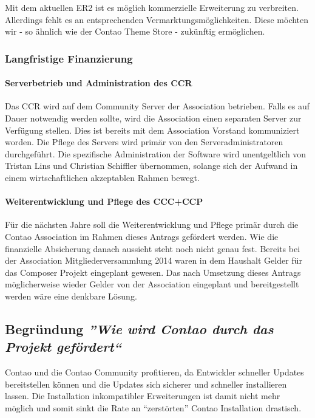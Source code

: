 \documentclass[
paper=a4,
draft=false,%
fontsize=10pt%
]{scrartcl}
\begin{document}
Mit dem aktuellen ER2 ist es möglich kommerzielle Erweiterung zu verbreiten. Allerdings fehlt es an entsprechenden Vermarktungsmöglichkeiten. Diese möchten wir - so ähnlich wie der Contao Theme Store - zukünftig ermöglichen.

\subsubsection{Langfristige Finanzierung}

\paragraph{Serverbetrieb und Administration des CCR}
Das CCR wird auf dem Community Server der Association betrieben. Falls es auf Dauer notwendig werden sollte, wird die Association einen separaten Server zur Verfügung stellen. Dies ist bereits mit dem Association Vorstand kommuniziert worden.
Die Pflege des Servers wird primär von den Serveradministratoren durchgeführt. Die spezifische Administration der Software wird unentgeltlich von Tristan Lins und Christian Schiffler übernommen, solange sich der Aufwand in einem wirtschaftlichen akzeptablen Rahmen bewegt.

\paragraph{Weiterentwicklung und Pflege des CCC+CCP}
Für die nächsten Jahre soll die Weiterentwicklung und Pflege primär durch die Contao Association im Rahmen dieses Antrags gefördert werden. Wie die finanzielle Absicherung danach aussieht steht noch nicht genau fest. Bereits bei der Association Mitgliederversammlung 2014 waren in dem Haushalt Gelder für das Composer Projekt eingeplant gewesen. Das nach Umsetzung dieses Antrags möglicherweise wieder Gelder von der Association eingeplant und bereitgestellt werden wäre eine denkbare Lösung.

\subsection{Begründung \emph{''Wie wird Contao durch das Projekt gefördert``}}

Contao und die Contao Community profitieren, da Entwickler schneller Updates bereitstellen können und die Updates sich sicherer und schneller installieren lassen. Die Installation inkompatibler Erweiterungen ist damit nicht mehr möglich und somit sinkt die Rate an “zerstörten” Contao Installation drastisch.
\end{document}
